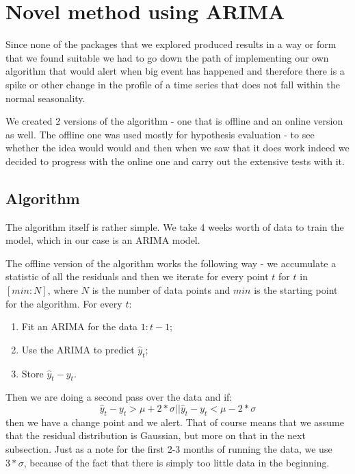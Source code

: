 \documentclass[minf,twoside,singlespacing,parskip,frontabs,notimes,12pt]{infthesis} %
\begin{document}
\newpage
\section{Novel method using ARIMA}
\label{sec:novel}

Since none of the packages that we explored produced results in a way or form that we found suitable we had to go down the path of implementing our own algorithm that would alert when  big event has happened and therefore there is a spike or other change in the profile of a time series that does not fall within the normal seasonality. 

We created 2 versions of the algorithm - one that is offline and an online version as well. The offline one was used mostly for hypothesis evaluation - to see whether the idea would would and then when we saw that it does work indeed we decided to progress with the online one and carry out the extensive tests with it.


\subsection{Algorithm}

The algorithm itself is rather simple. We take 4 weeks worth of data to train the model, which in our case is an ARIMA model. 

The offline version of the algorithm works the following way - we accumulate a statistic of all the residuals and then we iterate for every point $t$ for $t$ in $[min:N]$, where $N$ is the number of data points and  $min$ is the starting point for the algorithm. For every $t$:
\begin{enumerate}
\item Fit an ARIMA for the data $1:t-1$;
\item Use the ARIMA to predict $\hat{y}_t$; 
\item Store $\hat{y}_t  - y_t$.
\end{enumerate}

Then we are doing a second pass over the data and if:
\begin{equation}
\hat{y}_t  - y_t> \mu + 2*\sigma || \hat{y}_t  - y_t < \mu - 2*\sigma
\end{equation}
then we have a change point and we alert. That of course means that we assume that the residual distribution is Gaussian, but more on that in the next subsection. Just as a note for the first 2-3 months of running the data, we use $3*\sigma$, because of the fact that there is simply too little data in the beginning. 
\end{document}
